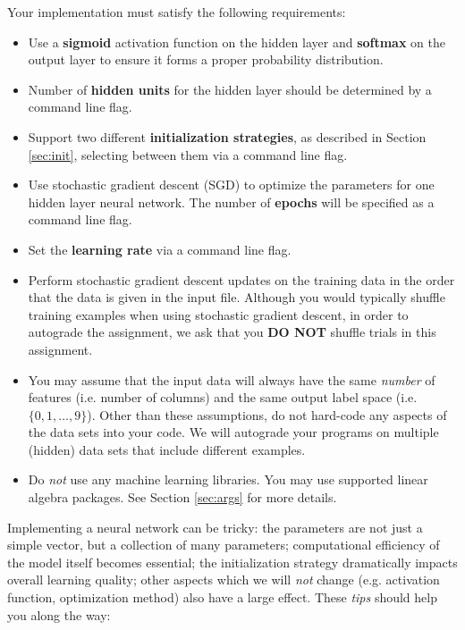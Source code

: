 \documentclass[11pt]{exam}
\numberwithin{equation}{section} %
\numberwithin{figure}{section} %
\numberwithin{table}{section} %
\begin{document}
Your implementation must satisfy the following requirements:
\begin{itemize}
    \item Use a {\bf sigmoid} activation function on the hidden layer and {\bf softmax} on the  output layer to ensure it forms a proper probability distribution.
    \item Number of {\bf hidden units} for the hidden layer should be determined by a command line flag.
    \item Support two different {\bf initialization strategies}, as described in Section \ref{sec:init}, selecting between them via a command line flag.
    \item Use stochastic gradient descent (SGD) to optimize the parameters for one hidden layer neural network. The number of {\bf epochs} will be specified as a command line flag. 
    \item Set the {\bf learning rate} via a command line flag.
    \item Perform stochastic gradient descent updates on the training data in the order that the data is given in the input file. Although you would typically shuffle training examples when using stochastic gradient descent, in order to autograde the assignment, we ask that you {\bf DO NOT} shuffle trials in this assignment.
    \item You may assume that the input data will always have the same \emph{number} of features (i.e. number of columns) and the same output label space (i.e. $\{0,1,\ldots,9\}$). Other than these assumptions, do not hard-code any aspects of the data sets into your code. We will autograde your programs on multiple (hidden) data sets that include different examples.
    \item Do \emph{not} use any machine learning libraries. You may use supported linear algebra packages. See Section \ref{sec:args} for more details.
\end{itemize}

Implementing a neural network can be tricky: the parameters are not just a simple vector, but a collection of many parameters; computational efficiency of the model itself becomes essential; the initialization strategy dramatically impacts overall learning quality;  other aspects which we will \emph{not} change (e.g. activation function, optimization method) also have a large effect. These \emph{tips} should help you along the way:
\end{document}

